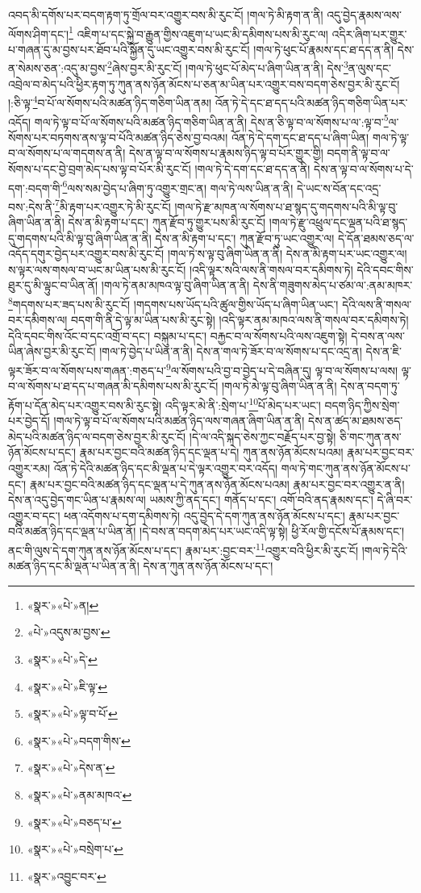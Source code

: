 འབད་མི་དགོས་པར་བདག་རྟག་ཏུ་གྲོལ་བར་འགྱུར་བས་མི་རུང་ངོ། །གལ་ཏེ་མི་རྟག་ན་ནི། འདུ་བྱེད་རྣམས་ལས་ལོགས་ཤིག་དང་།\footnote{«སྣར་»«པེ་»ན།} འཇིག་པ་དང་སྐྱེ་བ་རྒྱུན་གྱིས་འཇུག་པ་ཡང་མི་དམིགས་པས་མི་རུང་ལ། འདིར་ཞིག་པར་གྱུར་པ་གཞན་དུ་མ་བྱས་པར་ཐོབ་པའི་སྐྱོན་དུ་ཡང་འགྱུར་བས་མི་རུང་ངོ། །གལ་ཏེ་ཕུང་པོ་རྣམས་དང་ཐ་དད་ན་ནི། དེས་ན་སེམས་ཅན་:འདུ་མ་བྱས་\footnote{«པེ་»འདུས་མ་བྱས་}ཞེས་བྱར་མི་རུང་ངོ། །གལ་ཏེ་ཕུང་པོ་མེད་པ་ཞིག་ཡིན་ན་ནི། དེས་\footnote{«སྣར་»«པེ་»དེ་}ན་ལུས་དང་འབྲེལ་བ་མེད་པའི་ཕྱིར་རྟག་ཏུ་ཀུན་ནས་ཉོན་མོངས་པ་ཅན་མ་ཡིན་པར་འགྱུར་བས་བདག་ཅེས་བྱར་མི་རུང་ངོ། །:ཅི་ལྟ་\footnote{«སྣར་»«པེ་»ཇི་ལྟ་}བ་པོ་ལ་སོགས་པའི་མཚན་ཉིད་གཅིག་ཡིན་ནམ། འོན་ཏེ་དེ་དང་ཐ་དད་པའི་མཚན་ཉིད་གཅིག་ཡིན་པར་འདོད། གལ་ཏེ་ལྟ་བ་པོ་ལ་སོགས་པའི་མཚན་ཉིད་གཅིག་ཡིན་ན་ནི། དེས་ན་ཅི་ལྟ་བ་ལ་སོགས་པ་ལ་:ལྟ་བ་\footnote{«སྣར་»«པེ་»ལྟ་བ་པོ་}ལ་སོགས་པར་བཏགས་ནས་ལྟ་བ་པོའི་མཚན་ཉིད་ཅེས་བྱ་བའམ། འོན་ཏེ་དེ་དག་དང་ཐ་དད་པ་ཞིག་ཡིན། གལ་ཏེ་ལྟ་བ་ལ་སོགས་པ་ལ་གདགས་ན་ནི། དེས་ན་ལྟ་བ་ལ་སོགས་པ་རྣམས་ཉིད་ལྟ་བ་པོར་གྱུར་གྱི། བདག་ནི་ལྟ་བ་ལ་སོགས་པ་དང་བྱེ་བྲག་མེད་པས་ལྟ་བ་པོར་མི་རུང་ངོ། །གལ་ཏེ་དེ་དག་དང་ཐ་དད་ན་ནི། དེས་ན་ལྟ་བ་ལ་སོགས་པ་དེ་དག་:བདག་གི་\footnote{«སྣར་»«པེ་»བདག་གིས་}ལས་སམ་བྱེད་པ་ཞིག་ཏུ་འགྱུར་གྲང་ན། གལ་ཏེ་ལས་ཡིན་ན་ནི། དེ་ཡང་ས་བོན་དང་འདྲ་བས་:དེས་ནི་\footnote{«སྣར་»«པེ་»དེས་ན་}མི་རྟག་པར་འགྱུར་ཏེ་མི་རུང་ངོ། །གལ་ཏེ་རྫ་མཁན་ལ་སོགས་པ་ཐ་སྙད་དུ་གདགས་པའི་མི་ལྟ་བུ་ཞིག་ཡིན་ན་ནི། དེས་ན་མི་རྟག་པ་དང་། ཀུན་རྫོབ་ཏུ་གྱུར་པས་མི་རུང་ངོ། །གལ་ཏེ་རྫུ་འཕྲུལ་དང་ལྡན་པའི་ཐ་སྙད་དུ་གདགས་པའི་མི་ལྟ་བུ་ཞིག་ཡིན་ན་ནི། དེས་ན་མི་རྟག་པ་དང་། ཀུན་རྫོབ་ཏུ་ཡང་འགྱུར་ལ། དེ་དོན་ཐམས་ཅད་ལ་འདོད་དགུར་བྱེད་པར་འགྱུར་བས་མི་རུང་ངོ། །གལ་ཏེ་ས་ལྟ་བུ་ཞིག་ཡིན་ན་ནི། དེས་ན་མི་རྟག་པར་ཡང་འགྱུར་ལ། ས་ལྟར་ལས་གསལ་བ་ཡང་མ་ཡིན་པས་མི་རུང་ངོ། །འདི་ལྟར་སའི་ལས་ནི་གསལ་བར་དམིགས་ཏེ། དེའི་དབང་གིས་ཐུར་དུ་མི་ལྟུང་བ་ཡིན་ནོ། །གལ་ཏེ་ནམ་མཁའ་ལྟ་བུ་ཞིག་ཡིན་ན་ནི། དེས་ནི་གཟུགས་མེད་པ་ཙམ་ལ་:ནམ་མཁར་\footnote{«སྣར་»«པེ་»ནམ་མཁའ་}གདགས་པར་ཟད་པས་མི་རུང་ངོ། །གདགས་པས་ཡོད་པའི་ཚུལ་གྱིས་ཡོད་པ་ཞིག་ཡིན་ཡང་། དེའི་ལས་ནི་གསལ་བར་དམིགས་ལ། བདག་གི་ནི་དེ་ལྟ་མ་ཡིན་པས་མི་རུང་སྟེ། །འདི་ལྟར་ནམ་མཁའ་ལས་ནི་གསལ་བར་དམིགས་ཏེ། དེའི་དབང་གིས་འོང་བ་དང་འགྲོ་བ་དང་། བསྐུམ་པ་དང་། བརྐྱང་བ་ལ་སོགས་པའི་ལས་འཇུག་སྟེ། དེ་བས་ན་ལས་ཡིན་ཞེས་བྱར་མི་རུང་ངོ། །གལ་ཏེ་བྱེད་པ་ཡིན་ན་ནི། དེས་ན་གལ་ཏེ་ཟོར་བ་ལ་སོགས་པ་དང་འདྲ་ན། དེས་ན་ཇི་ལྟར་ཟོར་བ་ལ་སོགས་པས་གཞན་:གཅད་པ་\footnote{«སྣར་»«པེ་»བཅད་པ་}ལ་སོགས་པའི་བྱ་བ་བྱེད་པ་དེ་བཞིན་དུ། ལྟ་བ་ལ་སོགས་པ་ལས། ལྟ་བ་ལ་སོགས་པ་ཐ་དད་པ་གཞན་མི་དམིགས་པས་མི་རུང་ངོ། །གལ་ཏེ་མེ་ལྟ་བུ་ཞིག་ཡིན་ན་ནི། དེས་ན་བདག་ཏུ་རྟོག་པ་དོན་མེད་པར་འགྱུར་བས་མི་རུང་སྟེ། འདི་ལྟར་མེ་ནི་:སྲེག་པ་\footnote{«སྣར་»«པེ་»བསྲེག་པ་}པོ་མེད་པར་ཡང་། བདག་ཉིད་ཀྱིས་སྲེག་པར་བྱེད་དོ། །གལ་ཏེ་ལྟ་བ་པོ་ལ་སོགས་པའི་མཚན་ཉིད་ལས་གཞན་ཞིག་ཡིན་ན་ནི། དེས་ན་ཚད་མ་ཐམས་ཅད་མེད་པའི་མཚན་ཉིད་ལ་བདག་ཅེས་བྱར་མི་རུང་ངོ། །དེ་ལ་འདི་སྐད་ཅེས་ཀྱང་བརྗོད་པར་བྱ་སྟེ། ཅི་གང་ཀུན་ནས་ཉོན་མོངས་པ་དང་། རྣམ་པར་བྱང་བའི་མཚན་ཉིད་དང་ལྡན་པ་དེ། ཀུན་ནས་ཉོན་མོངས་པའམ། རྣམ་པར་བྱང་བར་འགྱུར་རམ། འོན་ཏེ་དེའི་མཚན་ཉིད་དང་མི་ལྡན་པ་དེ་ལྟར་འགྱུར་བར་འདོད། གལ་ཏེ་གང་ཀུན་ནས་ཉོན་མོངས་པ་དང་། རྣམ་པར་བྱང་བའི་མཚན་ཉིད་དང་ལྡན་པ་དེ་ཀུན་ནས་ཉོན་མོངས་པའམ། རྣམ་པར་བྱང་བར་འགྱུར་ན་ནི། དེས་ན་འདུ་བྱེད་གང་ཡིན་པ་རྣམས་ལ། ཡམས་ཀྱི་ནད་དང་། གནོད་པ་དང་། འགོ་བའི་ནད་རྣམས་དང་། དེ་ཞི་བར་འགྱུར་བ་དང་། ཕན་འདོགས་པ་དག་དམིགས་ཏེ། འདུ་བྱེད་དེ་དག་ཀུན་ནས་ཉོན་མོངས་པ་དང་། རྣམ་པར་བྱང་བའི་མཚན་ཉིད་དང་ལྡན་པ་ཡིན་ནོ། །དེ་བས་ན་བདག་མེད་པར་ཡང་འདི་ལྟ་སྟེ། ཕྱི་རོལ་གྱི་དངོས་པོ་རྣམས་དང་། ནང་གི་ལུས་དེ་དག་ཀུན་ནས་ཉོན་མོངས་པ་དང་། རྣམ་པར་:བྱང་བར་\footnote{«སྣར་»འབྱུང་བར་}འགྱུར་བའི་ཕྱིར་མི་རུང་ངོ། །གལ་ཏེ་དེའི་མཚན་ཉིད་དང་མི་ལྡན་པ་ཡིན་ན་ནི། དེས་ན་ཀུན་ནས་ཉོན་མོངས་པ་དང་། 